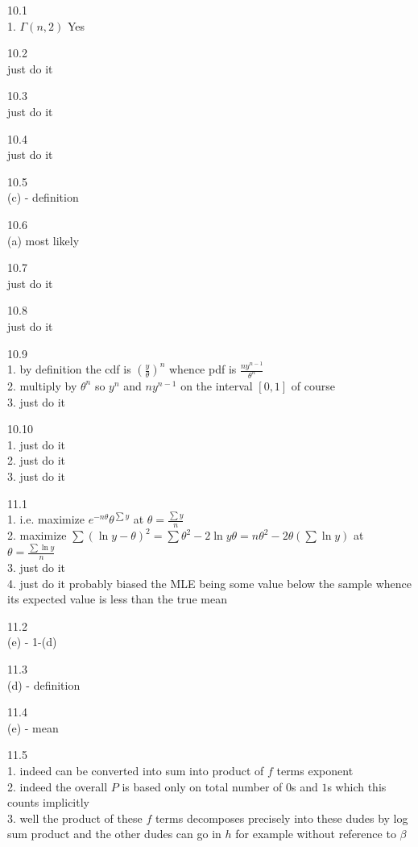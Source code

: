 \newpage

10.1 \\
1. $\Gamma (n,2)$ Yes

10.2 \\
just do it

10.3 \\
just do it

10.4 \\
just do it

10.5 \\
(c) - definition

10.6 \\
(a) most likely

10.7 \\
just do it

10.8 \\
just do it

10.9 \\
1. by definition the cdf is $(\frac{y}{\theta})^n$ whence pdf is $\frac{ny^{n-1}}{\theta^n}$\\
2. multiply by $\theta^n$ so $y^n$ and $ny^{n-1}$ on the interval $[0,1]$ of course \\
3. just do it

10.10 \\
1. just do it \\
2. just do it \\
3. just do it

\newpage

11.1 \\
1. i.e. maximize $e^{-n\theta}\theta^{\sum y}$ at $\theta=\frac{\sum y}{n}$\\
2. maximize $\sum (\ln{y}-\theta)^2=\sum \theta^2-2\ln{y}\theta=n\theta^2-2\theta(\sum \ln{y})$ at $\theta=\frac{\sum \ln{y}}{n}$\\
3. just do it \\
4. just do it probably biased the MLE being some value below the sample whence its expected value is less than the true mean

11.2 \\
(e) - 1-(d)

11.3 \\
(d) - definition

11.4 \\
(e) - mean

11.5 \\
1. indeed can be converted into sum into product of $f$ terms exponent \\
2. indeed the overall $P$ is based only on total number of $0$s and $1$s which this counts implicitly \\
3. well the product of these $f$ terms decomposes precisely into these dudes by log sum product and the other dudes can go in $h$ for example without reference to $\beta$

